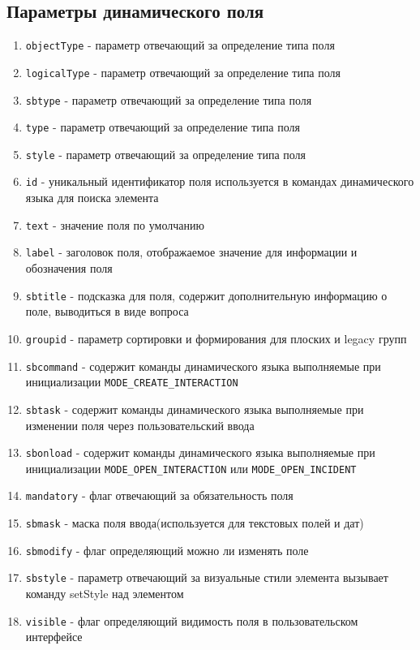 \documentclass[../index.tex]{subfiles}
\begin{document}
\subsection{Параметры динамического поля}
\begin{enumerate}
    \item \verb|objectType| - параметр отвечающий за определение типа поля
    \item \verb|logicalType| - параметр отвечающий за определение типа поля
    \item \verb|sbtype| - параметр отвечающий за определение типа поля
    \item \verb|type| - параметр отвечающий за определение типа поля
    \item \verb|style| - параметр отвечающий за определение типа поля
    \item \verb|id| - уникальный идентификатор поля используется в командах динамического языка для поиска элемента
    \item \verb|text| - значение поля по умолчанию
    \item \verb|label| - заголовок поля, отображаемое значение для информации и обозначения поля
    \item \verb|sbtitle| - подсказка для поля, содержит дополнительную информацию о поле, выводиться в виде вопроса
    \item \verb|groupid| - параметр сортировки и формирования для плоских и legacy групп
    \item \verb|sbcommand| - содержит команды динамического языка выполняемые при инициализации \verb|MODE_CREATE_INTERACTION|
    \item \verb|sbtask| - содержит команды динамического языка выполняемые при изменении поля через пользовательский ввода
    \item \verb|sbonload| - содержит команды динамического языка выполняемые при инициализации \verb|MODE_OPEN_INTERACTION| или \verb|MODE_OPEN_INCIDENT|
    \item \verb|mandatory| - флаг отвечающий за обязательность поля
    \item \verb|sbmask| - маска поля ввода(используется для текстовых полей и дат)
    \item \verb|sbmodify| - флаг определяющий можно ли изменять поле
    \item \verb|sbstyle| - параметр отвечающий за визуальные стили элемента вызывает команду setStyle над элементом
    \item \verb|visible| - флаг определяющий видимость поля в пользовательском интерфейсе

\end{enumerate}
\end{document}
